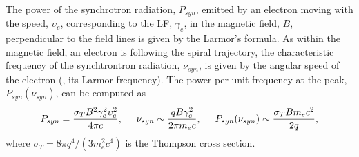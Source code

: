 %
%
The power of the synchrotron radiation, $P_{syn}$, emitted by an electron moving with 
the speed, $\upsilon_e$, corresponding to the \ac{LF}, $\gamma_e$, in the magnetic field, $B$, perpendicular 
to the field lines is given by the Larmor's formula.
%
As within the magnetic field, an electron is following the spiral trajectory,
the characteristic frequency of the synchtrontron radiation, $\nu_{syn}$, is given 
by the angular speed of the electron (\eg, its Larmor frequency).
%
The power per unit frequency at the peak, $P_{syn}(\nu_{syn})$, can be computed as 
\citep{RybickiLightman:1985}
%
\begin{equation}
P_{syn} = \frac{\sigma_TB^2\gamma_e^2\upsilon_e^2}{4\pi c}, 
\hspace{5mm} 
\nu_{syn} \sim \frac{q B \gamma_e^2}{2\pi m_e c},
\hspace{5mm}
P_{syn}(\nu_{syn}) \sim \frac{\sigma_T B m_e c^2}{2 q},
\end{equation}
%
where $\sigma_T = 8\pi q^4 / (3m_e^2c^4)$ is the Thompson cross section.

